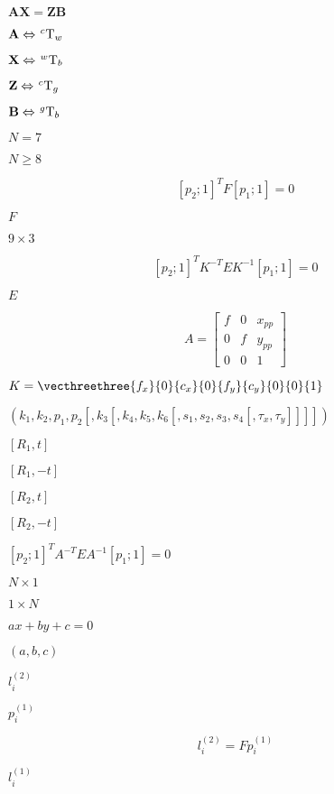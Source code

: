 \documentclass{article}
\begin{document}
$\mathbf{A}\mathbf{X}=\mathbf{Z}\mathbf{B}$
\pagebreak

$\mathbf{A} \Leftrightarrow \hspace{0.1em} _{}^{c}\textrm{T}_w$
\pagebreak

$\mathbf{X} \Leftrightarrow \hspace{0.1em} _{}^{w}\textrm{T}_b$
\pagebreak

$\mathbf{Z} \Leftrightarrow \hspace{0.1em} _{}^{c}\textrm{T}_g$
\pagebreak

$\mathbf{B} \Leftrightarrow \hspace{0.1em} _{}^{g}\textrm{T}_b$
\pagebreak

$N = 7$
\pagebreak

$N \ge 8$
\pagebreak

\[[p_2; 1]^T F [p_1; 1] = 0\]
\pagebreak

$F$
\pagebreak

$9 \times 3$
\pagebreak

\[[p_2; 1]^T K^{-T} E K^{-1} [p_1; 1] = 0\]
\pagebreak

$E$
\pagebreak

\[A = \begin{bmatrix} f & 0 & x_{pp} \\ 0 & f & y_{pp} \\ 0 & 0 & 1 \end{bmatrix}\]
\pagebreak

$K = \vecthreethree{f_x}{0}{c_x}{0}{f_y}{c_y}{0}{0}{1}$
\pagebreak

$(k_1, k_2, p_1, p_2[, k_3[, k_4, k_5, k_6[, s_1, s_2, s_3, s_4[, \tau_x, \tau_y]]]])$
\pagebreak

$[R_1, t]$
\pagebreak

$[R_1, -t]$
\pagebreak

$[R_2, t]$
\pagebreak

$[R_2, -t]$
\pagebreak

$[p_2; 1]^T A^{-T} E A^{-1} [p_1; 1] = 0$
\pagebreak

$N \times 1$
\pagebreak

$1 \times N$
\pagebreak

$ax + by + c=0$
\pagebreak

$(a, b, c)$
\pagebreak

$l^{(2)}_i$
\pagebreak

$p^{(1)}_i$
\pagebreak

\[l^{(2)}_i = F p^{(1)}_i\]
\pagebreak

$l^{(1)}_i$
\pagebreak
\end{document}
